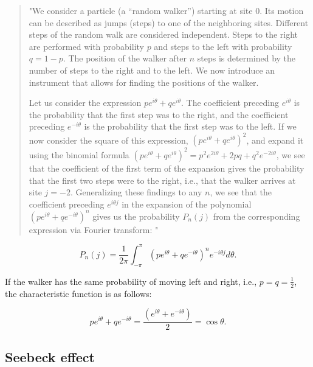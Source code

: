 \documentclass[reprint,amsmath,amssymb,aps,]{revtex4-1}
\numberwithin{equation}{section}%
\begin{document}
    \begin{quote}
        "We consider a particle (a ``random walker'') starting at site 0. Its motion can be described as jumps (steps) to one of the neighboring sites. Different steps of the random walk are considered independent. Steps to the right are performed with probability $p$ and steps to the left with probability $q = 1 - p$. The position of the walker after $n$ steps is determined by the number of steps to the right and to the left. We now introduce an instrument that allows for finding the positions of the walker.
        
        Let us consider the expression $p e^{i \theta} + q e^{i \theta}$. The coefficient preceding $e^{i \theta}$ is the probability that the first step was to the right, and the coefficient preceding $e^{-i \theta}$ is the probability that the first step was to the left. If we now consider the square of this expression, $(p e^{i \theta} + q e^{i \theta} )^2$, and expand it using the binomial formula $(p e^{i \theta} + q e^{i \theta} )^2 = p^{2} e^{2 i \theta} + 2 p q + q^{2} e^{-2 i \theta}$, we see that the coefficient of the first term of the expansion gives the probability that the first two steps were to the right, i.e., that the walker arrives at site $j = -2$. Generalizing these findings to any $n$, we see that the coefficient preceding  $e^{i \theta j}$ in the expansion of the polynomial $( p e^{i \theta} + q e^{-i \theta})^{n}$ gives us the probability $P_{n} (j)$ from the corresponding expression via Fourier transform: \cite{Klafter}"
    \end{quote}


    \begin{equation}
        P_{n} (j) = \frac{1}{2 \pi} \int_{-\pi}^{\pi} \left( p e^{i \theta} + q e^{-i \theta} \right)^{n} e^{-i \theta j} d\theta
        .
    \end{equation}


    If the walker has the same probability of moving left and right, i.e., $p = q = \frac{1}{2}$, the characteristic function is as follows:
    
    \begin{equation}
        p e^{i \theta} + q e^{-i \theta} = \frac{ \left( e^{i \theta} + e^{-i \theta} \right) }{2} = \cos \theta
        .
    \end{equation}



\subsection{Seebeck effect}
\end{document}
